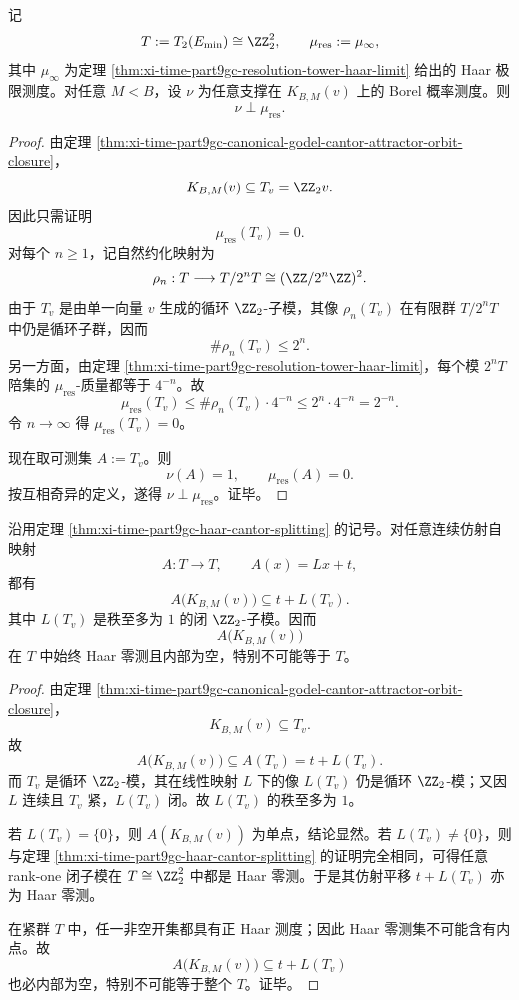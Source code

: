 \begin{theorem}\label{thm:xi-time-part9gc-haar-cantor-splitting}
记
\[
T:=T_2(E_{\min})\cong \ZZ_2^2,
\qquad
\mu_{\mathrm{res}}:=\mu_\infty,
\]
其中 \(\mu_\infty\) 为定理 \ref{thm:xi-time-part9gc-resolution-tower-haar-limit} 给出的 Haar 极限测度。对任意 \(M<B\)，设 \(\nu\) 为任意支撑在 \(K_{B,M}(v)\) 上的 Borel 概率测度。则
\[
\nu\perp \mu_{\mathrm{res}}.
\]
\end{theorem}
\begin{proof}
由定理 \ref{thm:xi-time-part9gc-canonical-godel-cantor-attractor-orbit-closure}，
\[
K_{B,M}(v)\subseteq T_v=\ZZ_2v.
\]
因此只需证明
\[
\mu_{\mathrm{res}}(T_v)=0.
\]
对每个 \(n\ge 1\)，记自然约化映射为
\[
\rho_n:T\longrightarrow T/2^nT\cong (\ZZ/2^n\ZZ)^2.
\]
由于 \(T_v\) 是由单一向量 \(v\) 生成的循环 \(\ZZ_2\)-子模，其像 \(\rho_n(T_v)\) 在有限群 \(T/2^nT\) 中仍是循环子群，因而
\[
\#\rho_n(T_v)\le 2^n.
\]
另一方面，由定理 \ref{thm:xi-time-part9gc-resolution-tower-haar-limit}，每个模 \(2^nT\) 陪集的 \(\mu_{\mathrm{res}}\)-质量都等于 \(4^{-n}\)。故
\[
\mu_{\mathrm{res}}(T_v)
\le
\#\rho_n(T_v)\cdot 4^{-n}
\le
2^n\cdot 4^{-n}
=
2^{-n}.
\]
令 \(n\to\infty\) 得 \(\mu_{\mathrm{res}}(T_v)=0\)。

现在取可测集 \(A:=T_v\)。则
\[
\nu(A)=1,
\qquad
\mu_{\mathrm{res}}(A)=0.
\]
按互相奇异的定义，遂得 \(\nu\perp \mu_{\mathrm{res}}\)。证毕。
\end{proof}

\begin{corollary}\label{cor:xi-time-part9gc-affine-nonrecoverability-fullrank-space}
沿用定理 \ref{thm:xi-time-part9gc-haar-cantor-splitting} 的记号。对任意连续仿射自映射
\[
A:T\longrightarrow T,
\qquad
A(x)=Lx+t,
\]
都有
\[
A\bigl(K_{B,M}(v)\bigr)\subseteq t+L(T_v).
\]
其中 \(L(T_v)\) 是秩至多为 \(1\) 的闭 \(\ZZ_2\)-子模。因而
\[
A\bigl(K_{B,M}(v)\bigr)
\]
在 \(T\) 中始终 Haar 零测且内部为空，特别不可能等于 \(T\)。
\end{corollary}
\begin{proof}
由定理 \ref{thm:xi-time-part9gc-canonical-godel-cantor-attractor-orbit-closure}，
\[
K_{B,M}(v)\subseteq T_v.
\]
故
\[
A\bigl(K_{B,M}(v)\bigr)\subseteq A(T_v)=t+L(T_v).
\]
而 \(T_v\) 是循环 \(\ZZ_2\)-模，其在线性映射 \(L\) 下的像 \(L(T_v)\) 仍是循环 \(\ZZ_2\)-模；又因 \(L\) 连续且 \(T_v\) 紧，\(L(T_v)\) 闭。故 \(L(T_v)\) 的秩至多为 \(1\)。

若 \(L(T_v)=\{0\}\)，则 \(A(K_{B,M}(v))\) 为单点，结论显然。若 \(L(T_v)\neq \{0\}\)，则与定理 \ref{thm:xi-time-part9gc-haar-cantor-splitting} 的证明完全相同，可得任意 rank-one 闭子模在 \(T\cong \ZZ_2^2\) 中都是 Haar 零测。于是其仿射平移 \(t+L(T_v)\) 亦为 Haar 零测。

在紧群 \(T\) 中，任一非空开集都具有正 Haar 测度；因此 Haar 零测集不可能含有内点。故
\[
A\bigl(K_{B,M}(v)\bigr)
\subseteq
t+L(T_v)
\]
也必内部为空，特别不可能等于整个 \(T\)。证毕。
\end{proof}

